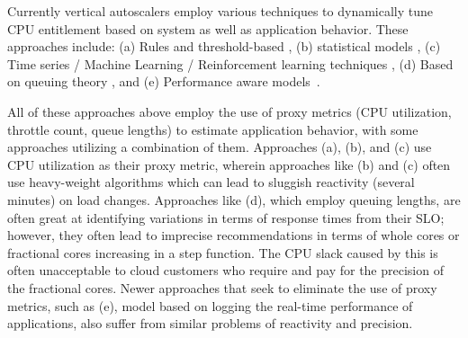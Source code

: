
Currently vertical autoscalers employ various techniques \cite{lorido-botran_review_2014,qu_auto-scaling_2018} to dynamically tune CPU entitlement based on system as well as application behavior. These approaches include: (a) Rules and threshold-based \cite{edb-msft_autoscale_2023,noauthor_aws_nodate}, (b) statistical models \cite{noauthor_kubernetes_nodate,sachidananda_collective_2022,rattihalli_exploring_2019}, (c) Time series / Machine Learning / Reinforcement learning techniques \cite{qiu_firm_nodate,wang_predicting_2021,rzadca_autopilot_2020, wang_autothrottle_2023}, (d) Based on queuing theory \cite{fried_caladan_2020, ali-eldin_adaptive_2012, ousterhout_shenango_2019}, and (e) Performance aware models~\cite{bhardwaj_cilantro_2023}. 

All of these approaches above employ the use of proxy metrics (CPU utilization, throttle count, queue lengths) to estimate application behavior, with some approaches utilizing a combination of them.  Approaches (a), (b), and (c) use CPU utilization as their proxy metric, wherein approaches like (b) and (c) often use heavy-weight algorithms which can lead to sluggish reactivity (several minutes) on load changes. 
 Approaches like (d), which employ queuing lengths, are often great at identifying variations in terms of response times from their SLO; however, they often lead to imprecise recommendations in terms of whole cores or fractional cores increasing in a step function. The CPU slack caused by this is often unacceptable to cloud customers who require and pay for the precision of the fractional cores. Newer approaches that seek to eliminate the use of proxy metrics, such as (e), model based on logging the real-time performance of applications, also suffer from similar problems of reactivity and precision. 

